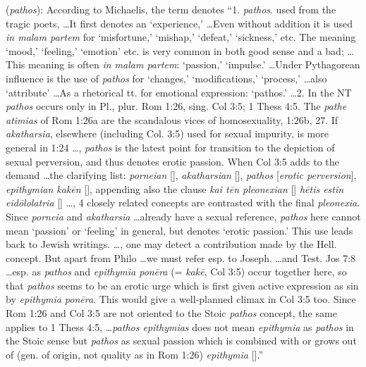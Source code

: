 \item[Erotic perversion,]

(\textit{pathos}):
According to Michaelis, the term denotes ``1. \emph{pathos}. used from the tragic poets, \ldots It first denotes an `experience,' \ldots Even without addition it is used \emph{in malam partem} for `misfortune,' `mishap,' `defeat,' `sickness,' etc. The meaning `mood,' `feeling,' `emotion' etc. is very common in both good sense and a bad; \ldots This meaning is often \emph{in malam partem}: `passion,' `impulse.' \ldots Under Pythagorean influence is the use of \emph{pathos} for `changes,' `modifications,' `process,' \ldots also `attribute' \ldots As a rhetorical tt. for emotional expression: `pathos.' \ldots 2. In the NT \emph{pathos} occurs only in Pl., plur. Rom 1:26, sing. Col 3:5; 1 Thess 4:5. The \emph{pathe atimias} of Rom 1:26a are the scandalous vices of homosexuality, 1:26b, 27. If \emph{akatharsia}, elsewhere (including Col. 3:5) used for sexual impurity, is more general in 1:24 \ldots, \emph{pathos} is the latest point for transition to the depiction of sexual perversion, and thus denotes erotic passion. When Col 3:5 adds to the demand \ldots the clarifying list: \emph{porneian} [], \emph{akatharsian} [], \emph{pathos} [\emph{erotic perversion}], \emph{epithymian kakēn} [], appending also the clause \emph{kai tēn pleonexian} [] \emph{hētis estin eidōlolatria} [] \ldots, 4 closely related concepts are contrasted with the final \emph{pleonexia}. Since \emph{porneia} and \emph{akatharsia} \ldots already have a sexual reference, \emph{pathos} here cannot mean `passion' or `feeling' in general, but denotes `erotic passion.' This use leads back to Jewish writings. \ldots, one may detect a contribution made by the Hell. concept. But apart from Philo \ldots we must refer esp. to Joseph. \ldots and Test. Jos 7:8 \ldots esp. as \emph{pathos} and \emph{epithymia ponēra} (= \emph{kakē}, Col 3:5) occur together here, so that \emph{pathos} seems to be an erotic urge which is first given active expression as sin by \emph{epithymia ponēra}. This would give a well-planned climax in Col 3:5 too. Since Rom 1:26 and Col 3:5 are not oriented to the Stoic \emph{pathos} concept, the same applies to 1 Thess 4:5, \ldots \emph{pathos epithymias} does not mean \emph{epithymia} as \emph{pathos} in the Stoic sense but \emph{pathos} as sexual passion which is combined with or grows out of (gen. of origin, not quality as in Rom 1:26) \emph{epithymia} [].''
